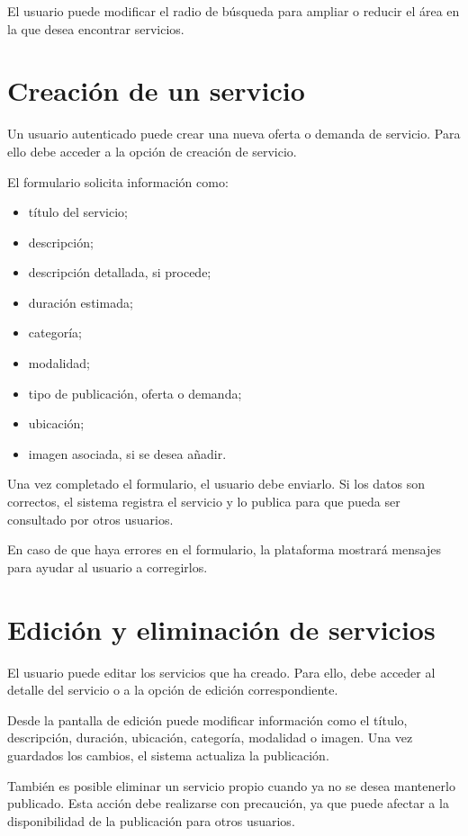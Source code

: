 El usuario puede modificar el radio de búsqueda para ampliar o reducir el área en la que desea encontrar servicios.

\section{Creación de un servicio}

Un usuario autenticado puede crear una nueva oferta o demanda de servicio. Para ello debe acceder a la opción de creación de servicio.

El formulario solicita información como:

\begin{itemize}
    \item título del servicio;
    \item descripción;
    \item descripción detallada, si procede;
    \item duración estimada;
    \item categoría;
    \item modalidad;
    \item tipo de publicación, oferta o demanda;
    \item ubicación;
    \item imagen asociada, si se desea añadir.
\end{itemize}

Una vez completado el formulario, el usuario debe enviarlo. Si los datos son correctos, el sistema registra el servicio y lo publica para que pueda ser consultado por otros usuarios.

En caso de que haya errores en el formulario, la plataforma mostrará mensajes para ayudar al usuario a corregirlos.

\section{Edición y eliminación de servicios}

El usuario puede editar los servicios que ha creado. Para ello, debe acceder al detalle del servicio o a la opción de edición correspondiente.

Desde la pantalla de edición puede modificar información como el título, descripción, duración, ubicación, categoría, modalidad o imagen. Una vez guardados los cambios, el sistema actualiza la publicación.

También es posible eliminar un servicio propio cuando ya no se desea mantenerlo publicado. Esta acción debe realizarse con precaución, ya que puede afectar a la disponibilidad de la publicación para otros usuarios.

